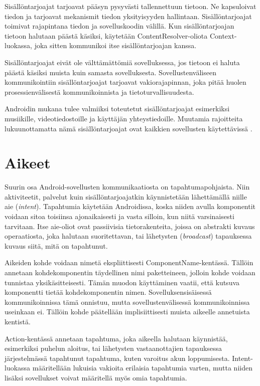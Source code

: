Sisällöntarjoajat tarjoavat pääsyn pysyvästi tallennettuun tietoon. Ne kapsuloivat tiedon ja tarjoavat mekanismit tiedon yksityisyyden hallintaan. Sisällöntarjoajat toimivat rajapintana tiedon ja sovelluskoodin välillä. Kun sisällöntarjoajan tietoon halutaan päästä käsiksi, käytetään ContentResolver-oliota Context-luokassa, joka sitten kommunikoi itse sisällöntarjoajan kanssa.

Sisällöntarjoajat eivät ole välttämättömiä sovelluksessa, jos tietoon ei haluta päästä käsiksi muista kuin samasta sovelluksesta. Sovellustenväliseen kommunikointiin sisällöntarjoajat tarjoavat vakiorajapinnan, joka pitää huolen prosessienvälisestä kommunikoinnista ja tietoturvallisuudesta.

Androidin mukana tulee valmiiksi toteutetut sisällöntarjoajat esimerkiksi musiikille, videotiedostoille ja käyttäjän yhteystiedoille. Muutamia rajoitteita lukuunottamatta nämä sisällöntarjoajat ovat kaikkien sovellusten käytettävissä \cite{android}.

\section{Aikeet}
\label{intents}

Suurin osa Android-sovellusten kommunikaatiosta on tapahtumapohjaista. Niin aktiviteetit, palvelut kuin sisällöntarjoajatkin käynnistetään lähettämällä niille aie (\emph{intent}). Tapahtumia käytetään Androidissa, koska niiden avulla komponentit voidaan sitoa toisiinsa ajonaikaisesti ja vasta silloin, kun niitä varsinaisesti tarvitaan. Itse aie-oliot ovat passiivisia tietorakenteita, joissa on abstrakti kuvaus operaatiosta, joka halutaan suoritettavan, tai lähetysten (\emph{broadcast}) tapauksessa kuvaus siitä, mitä on tapahtunut. 

Aikeiden kohde voidaan nimetä ekspliittisesti ComponentName-kentässä. Tällöin annetaan kohdekomponentin täydellinen nimi paketteineen, jolloin kohde voidaan tunnistaa yksikäsitteisesti. Tämän muodon käyttäminen vaatii, että kutsuva komponentti tietää kohdekomponentin nimen. Sovelluksensisäisessä kommunikoinnissa tämä onnistuu, mutta sovellustenvälisessä kommunikoinnissa useinkaan ei. Tällöin kohde päätellään implisiittisesti muista aikeelle annetuista kentistä.

Action-kentässä annetaan tapahtuma, joka aikeella halutaan käynnistää, esimerkiksi puhelun aloitus, tai lähetysten vastaanottajien tapauksessa järjestelmässä tapahtunut tapahtuma, kuten varoitus akun loppumisesta. Intent-luokassa määritellään lukuisia vakioita erilaisia tapahtumia varten, mutta niiden lisäksi sovellukset voivat määritellä myös omia tapahtumia.

